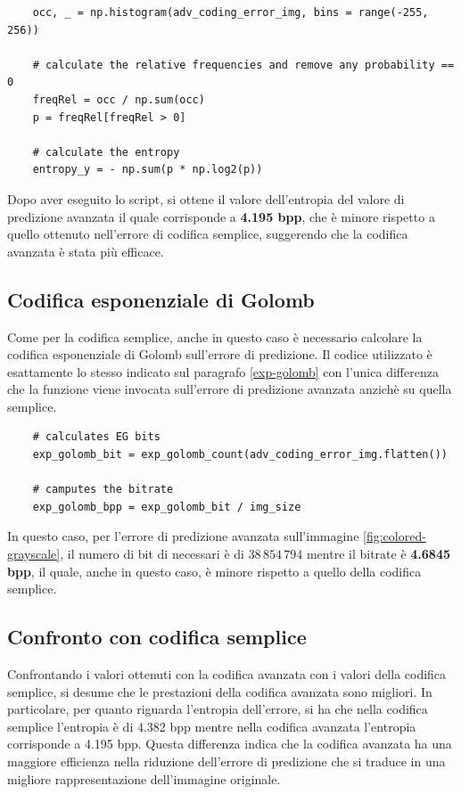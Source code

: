 \begin{lstlisting}
    occ, _ = np.histogram(adv_coding_error_img, bins = range(-255, 256))

    # calculate the relative frequencies and remove any probability == 0
    freqRel = occ / np.sum(occ)
    p = freqRel[freqRel > 0]

    # calculate the entropy
    entropy_y = - np.sum(p * np.log2(p))
\end{lstlisting}

\noindent Dopo aver eseguito lo script, si ottene il valore dell'entropia del valore di predizione avanzata il quale corrisponde a \textbf{4.195 bpp}, che è minore rispetto a quello ottenuto nell'errore di codifica semplice, suggerendo che la codifica avanzata è stata più efficace.



\vspace{15px}\subsection{Codifica esponenziale di Golomb}
Come per la codifica semplice, anche in questo caso è necessario calcolare la codifica esponenziale di Golomb sull'errore di predizione. Il codice utilizzato è esattamente lo stesso indicato sul paragrafo \ref{exp-golomb} con l'unica differenza che la funzione viene invocata sull'errore di predizione avanzata anzichè su quella semplice.

\begin{lstlisting}
    # calculates EG bits
    exp_golomb_bit = exp_golomb_count(adv_coding_error_img.flatten())
    
    # camputes the bitrate
    exp_golomb_bpp = exp_golomb_bit / img_size
\end{lstlisting}

\noindent In questo caso, per l'errore di predizione avanzata sull'immagine \ref{fig:colored-grayscale}, il numero di bit di necessari è di $38\,854\,794$ mentre il bitrate è \textbf{4.6845 bpp}, il quale, anche in questo caso, è minore rispetto a quello della codifica semplice. 



\vspace{15px}\subsection{Confronto con codifica semplice}
Confrontando i valori ottenuti con la codifica avanzata con i valori della codifica semplice, si desume che le prestazioni della codifica avanzata sono migliori. In particolare, per quanto riguarda l'entropia dell'errore, si ha che nella codifica semplice l'entropia è di 4.382 bpp mentre nella codifica avanzata l'entropia corrisponde a 4.195 bpp. Questa differenza indica che la codifica avanzata ha una maggiore efficienza nella riduzione dell'errore di predizione che si traduce in una migliore rappresentazione dell'immagine originale.

